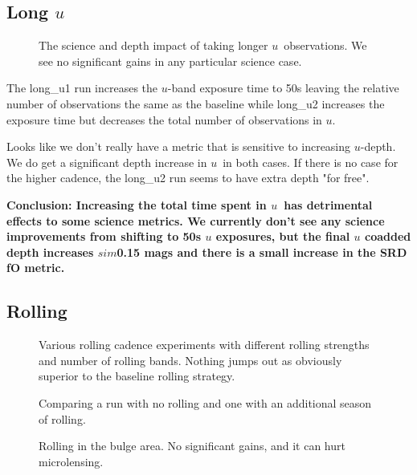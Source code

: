 \subsection{Long $u$}

\begin{figure}
\caption{The science and depth impact of taking longer $u$\ observations. We see no significant gains in any particular science case.\label{fig:long_u}}
\end{figure}


The long\_u1 run increases the $u$-band exposure time to 50s leaving the relative number of observations the same as the baseline while long\_u2 increases the exposure time but decreases the total number of observations in $u$. 

Looks like we don't really have a metric that is sensitive to increasing $u$-depth. We do get a significant depth increase in $u$\ in both cases. If there is no case for the higher cadence, the long\_u2 run seems to have extra depth "for free".

{\bf Conclusion:  Increasing the total time spent in $u$\ has detrimental effects to some science metrics. We currently don't see any science improvements from shifting to 50s $u$ exposures, but the final $u$ coadded depth increases $sim$0.15 mags and there is a small increase in the SRD fO metric.}


\subsection{Rolling}


\begin{figure}
\caption{Various rolling cadence experiments with different rolling strengths and number of rolling bands. Nothing jumps out as obviously superior to the baseline rolling strategy. \label{fig:rolling}}
\end{figure}


\begin{figure}
\caption{Comparing a run with no rolling and one with an additional season of rolling. \label{fig:rolling_more}}
\end{figure}


\begin{figure}
\caption{Rolling in the bulge area. No significant gains, and it can hurt microlensing. \label{fig:rolling_bulge}}
\end{figure}

